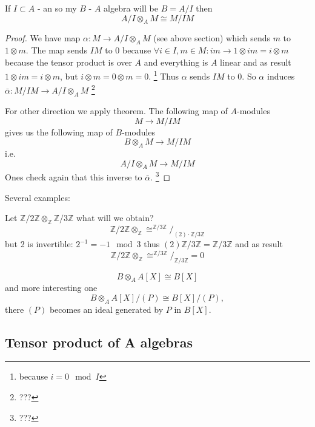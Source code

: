 \begin{proposition}
  If $I \subset A$ - an  so my $B$ - $A$ algebra
  will be $B = A/I$ then
  \[
  A/I \otimes_A M \cong M/IM
  \]
  \begin{proof}
    We have map $\alpha: M \to A/I \otimes_A M$ (see above section)
    which sends $m$ to $1 \otimes m$. The map sends $IM$ to $0$
    because
    $\forall i \in I, m \in M : im \to 1 \otimes im = i \otimes m$
    because the tensor product is over $A$ and everything is $A$
    linear and as result $1 \otimes im = i \otimes m$,
    but $i \otimes m = 0 \otimes m = 0$.
    \footnote{
      because
      $i = 0 \mod I$
    }
    Thus $\alpha$ sends $IM$ to 0. So $\alpha$ induces
    $\bar{\alpha}: M/IM \to A/I \otimes_A M$
    \footnote{
      ???
    }

    For other direction we apply  theorem. The
    following map of $A$-modules
    \[
    M \to M/IM
    \]
    gives us the following map of $B$-modules
    \[
    B \otimes_A M \to M/IM
    \]
    i.e.
    \[
    A/I \otimes_A M \to M/IM
    \]
    Ones check again that this inverse to $\bar{\alpha}$.
    \footnote{
      ???
    }
  \end{proof}
  \label{prop:lec4_prop2}
\end{proposition}

Several examples:
\begin{example}
  Let $\mathbb{Z}/2\mathbb{Z} \otimes_\mathbb{Z}
  \mathbb{Z}/3\mathbb{Z}$ what will we obtain?
  \[
  \mathbb{Z}/2\mathbb{Z} \otimes_\mathbb{Z} \cong
  ^{\mathbb{Z}/3\mathbb{Z}}/_{(2) \cdot \mathbb{Z}/3\mathbb{Z}}
  \]
  but 2 is invertible: $2^{-1} = -1 \mod 3$ thus
  $(2)\mathbb{Z}/3\mathbb{Z} =\mathbb{Z}/3\mathbb{Z}$ and as result
   \[
  \mathbb{Z}/2\mathbb{Z} \otimes_\mathbb{Z} \cong
  ^{\mathbb{Z}/3\mathbb{Z}}/_{ \mathbb{Z}/3\mathbb{Z}} = 0
  \]
\end{example}

\begin{example}
  \[
  B \otimes_A A\left[X\right] \cong B\left[X\right]
  \]
  and more interesting one
  \[
  B \otimes_A A\left[X\right]/(P) \cong B\left[X\right]/(P),
  \]
  there $(P)$ becomes an ideal generated by $P$ in
  $B\left[X\right]$.
\end{example}

\subsection{Tensor product of A algebras}

